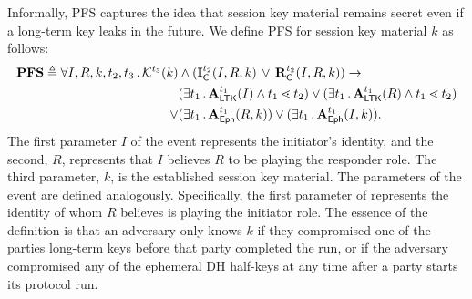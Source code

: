 \label{sec:secrecy}
%
Informally, PFS captures the idea that session key material remains secret
even if a long-term key leaks in the future.
%
%
We define PFS for session key material $k$ as follows:
%
\begin{align*}
    \mathbf{PFS} \triangleq
    \forall I, R, k, t_2, t_3\operatorname{.}
    \mathcal{K}^{t_3}(k) & \land (\mathbf{I}_{\textsf{C}}^{t_2}(I, R, k)\, \lor\,  \mathbf{R}_{\textsf{C}}^{t_2}(I, R, k))
    \rightarrow\\
    &(\exists t_1\operatorname{.} \mathbf{A}_{\textsf{LTK}}^{t_1}(I) \land t_1 \lessdot t_2)
    \lor (\exists t_1\operatorname{.} \mathbf{A}_{\textsf{LTK}}^{t_1}(R) \land t_1 \lessdot t_2)\\
    \lor&(\exists t_1\operatorname{.} \mathbf{A}_{\textsf{Eph}}^{t_1}(R, k))
    \lor(\exists t_1\operatorname{.} \mathbf{A}_{\textsf{Eph}}^{t_1}(I, k)).
\end{align*}
%
The first parameter $I$ of the \mIComplete{} event represents the
initiator's identity,
and the second, $R$, represents that $I$ believes $R$ to be playing
the responder role.
%
The third parameter, $k$, is the established session key material.
%
The parameters of the \mRComplete{} event are defined analogously.
%
Specifically, the first parameter of \mRComplete{} represents the identity of
whom $R$ believes is playing the initiator role.
%
%
The essence of the definition is that an adversary only knows $k$ if they
compromised one of the
parties long-term keys before that party completed the run, or if the adversary
compromised any of the ephemeral DH half-keys at any time after a party starts
its protocol run.

